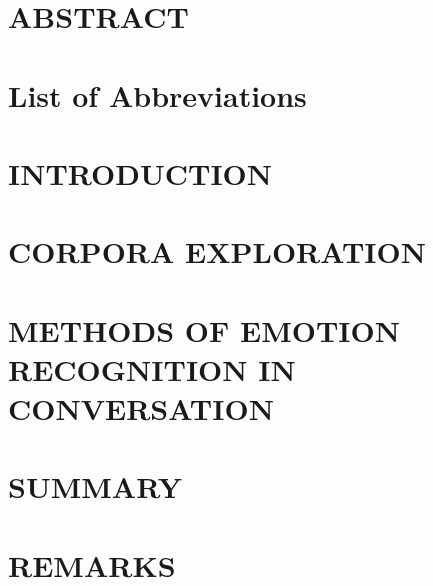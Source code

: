 \documentclass[hidelinks, 12pt, oneside]{book}
\begin{document}
\frontmatter


\chapter*{ABSTRACT}


\tableofcontents

\chapter*{List of Abbreviations}






\mainmatter
\chapter{INTRODUCTION}


\chapter{CORPORA EXPLORATION}


\chapter{METHODS OF EMOTION RECOGNITION IN CONVERSATION}


\chapter{SUMMARY}


\chapter{REMARKS}






\backmatter
{}


\end{document}
